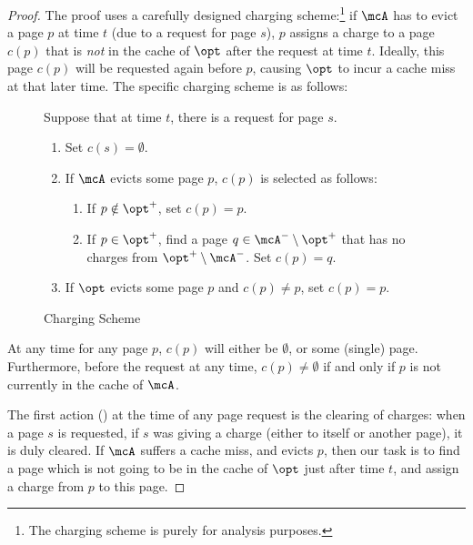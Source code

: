 \documentclass[11pt]{article}
\begin{document}
\begin{proof}
The proof uses a carefully designed charging scheme:\footnote{The charging scheme is purely for analysis purposes.} if $\mcA$ has to evict a page $p$ at time $t$ (due to a request for page $s$), $p$ assigns a charge to a page $c(p)$ that is \textit{not} in the cache of $\opt$ after the request at time $t$. Ideally, this page $c(p)$ will be requested again before $p$, causing $\opt$ to incur a cache miss at that later time. The specific charging scheme is as follows:
    \begin{figure}[H]
        \begin{framed}
        Suppose that at time $t$, there is a request for page $s$.
            \vspace{-2mm}
                \begin{enumerate}
                    \item \label{item:clear-charges} Set $c(s)=\emptyset$.
                    \item \label{item:assign-charge} If $\mcA$ evicts some page $p$, $c(p)$ is selected as follows:
                    \begin{enumerate}
                        \item \label{item:p-not-in-opt+} If $p \notin \opt^+$, set $c(p)=p$.
                        \item \label{item:p-in-opt+} If $p \in \opt^+$, find a page $q \in \mcA^- \setminus \opt^+$ that has no charges from $\opt^+ \setminus \mcA^-$. Set $c(p)=q$.\footnotemark
                    \end{enumerate}
                    \item \label{item:opt-eviction-charge-reassign} If $\opt$ evicts some page $p$ and $c(p) \neq p$, set $c(p)=p$.
                \end{enumerate}
            \vspace{-2mm}
        \end{framed}
        \vspace{-4mm}
        \caption{Charging Scheme}
        \label{fig:charging-scheme}
    \end{figure}
    At any time for any page $p$, $c(p)$ will either be $\emptyset$, or some (single) page. Furthermore, before the request at any time, $c(p) \neq \emptyset$ if and only if $p$ is not currently in the cache of $\mcA$.
    
    The first action () at the time of any page request is the clearing of charges: when a page $s$ is requested, if $s$ was giving a charge (either to itself or another page), it is duly cleared. If $\mcA$ suffers a cache miss, and evicts $p$, then our task is to find a page which is not going to be in the cache of $\opt$ just after time $t$, and assign a charge from $p$ to this page.
    

\end{proof}
\end{document}
